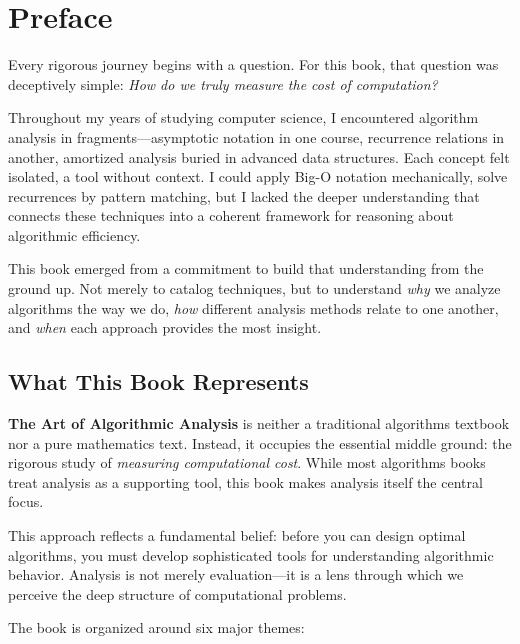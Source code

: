 
\chapter*{Preface}

Every rigorous journey begins with a question. For this book, that question was deceptively simple: \textit{How do we truly measure the cost of computation?}

Throughout my years of studying computer science, I encountered algorithm analysis in fragments—asymptotic notation in one course, recurrence relations in another, amortized analysis buried in advanced data structures. Each concept felt isolated, a tool without context. I could apply Big-O notation mechanically, solve recurrences by pattern matching, but I lacked the deeper understanding that connects these techniques into a coherent framework for reasoning about algorithmic efficiency.

This book emerged from a commitment to build that understanding from the ground up. Not merely to catalog techniques, but to understand \textit{why} we analyze algorithms the way we do, \textit{how} different analysis methods relate to one another, and \textit{when} each approach provides the most insight.

\section*{What This Book Represents}

\textbf{The Art of Algorithmic Analysis} is neither a traditional algorithms textbook nor a pure mathematics text. Instead, it occupies the essential middle ground: the rigorous study of \textit{measuring computational cost}. While most algorithms books treat analysis as a supporting tool, this book makes analysis itself the central focus.

This approach reflects a fundamental belief: before you can design optimal algorithms, you must develop sophisticated tools for understanding algorithmic behavior. Analysis is not merely evaluation—it is a lens through which we perceive the deep structure of computational problems.

The book is organized around six major themes:

